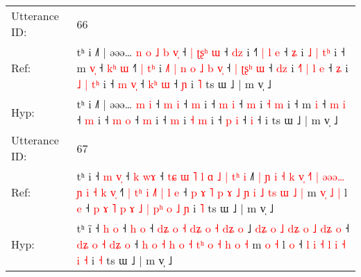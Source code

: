 \documentclass[10pt]{article}
\DeclareRobustCommand{\hl}[1]{{\textcolor{red}{#1}}}
\begin{document}
\begin{longtable}{ll}
 \\
\midrule
Utterance ID: & 66 \\
Ref: & tʰ i ˩˥ | əəə…\hl{ }\hl{n}\hl{ }\hl{o}\hl{ }\hl{˩} \hl{b} \hl{v}\hl{̩} ˧\hl{ }\hl{|} \hl{ʈ}\hl{ʂ}\hl{ʰ} \hl{ɯ} ˧ \hl{d}\hl{z} i ˧\hl{˥}\hl{ }\hl{|} \hl{l} \hl{e} ˧ \hl{ʑ} i\hl{ }\hl{˩} \hl{|} \hl{t}\hl{ʰ} i ˧ m \hl{v}\hl{̩} ˧ \hl{k}\hl{ʰ} \hl{ɯ} ˧\hl{˥}\hl{ }\hl{|} \hl{t}\hl{ʰ} i\hl{ }\hl{˩}\hl{˥}\hl{ }\hl{|}\hl{ }\hl{n}\hl{ }\hl{o}\hl{ }\hl{˩}\hl{ }\hl{b}\hl{ }\hl{v}\hl{̩} ˧\hl{ }\hl{|} \hl{ʈ}\hl{ʂ}\hl{ʰ} \hl{ɯ} ˧ \hl{d}\hl{z} i\hl{ }\hl{˧}\hl{˥}\hl{ }\hl{|}\hl{ }\hl{l}\hl{ }\hl{e} ˧ \hl{ʑ} i\hl{ }\hl{˩} \hl{|} \hl{t}\hl{ʰ} i ˧ \hl{m} \hl{v}\hl{̩} ˧\hl{ }\hl{k}\hl{ʰ} \hl{ɯ} ˧\hl{ }\hl{ɲ} i\hl{ }\hl{˥} ts ɯ ˩ | m v̩ ˩
 \\
Hyp: & tʰ i ˩˥ | əəə…\hl{}\hl{}\hl{}\hl{}\hl{}\hl{} \hl{m} \hl{}\hl{i} ˧\hl{}\hl{} \hl{}\hl{}\hl{m} \hl{i} ˧ \hl{}\hl{m} i ˧\hl{}\hl{}\hl{} \hl{m} \hl{i} ˧ \hl{m} i\hl{}\hl{} \hl{˧} \hl{}\hl{m} i ˧ m \hl{}\hl{i} ˧ \hl{}\hl{m} \hl{i} ˧\hl{}\hl{}\hl{} \hl{}\hl{m} i\hl{}\hl{}\hl{}\hl{}\hl{}\hl{}\hl{}\hl{}\hl{}\hl{}\hl{}\hl{}\hl{}\hl{}\hl{}\hl{} ˧\hl{}\hl{} \hl{}\hl{}\hl{m} \hl{o} ˧ \hl{}\hl{m} i\hl{}\hl{}\hl{}\hl{}\hl{}\hl{}\hl{}\hl{}\hl{} ˧ \hl{m} i\hl{}\hl{} \hl{˧} \hl{}\hl{m} i ˧ \hl{p} \hl{}\hl{i} ˧\hl{}\hl{}\hl{} \hl{i} ˧\hl{}\hl{} i\hl{}\hl{} ts ɯ ˩ | m v̩ ˩
 \\
\midrule
Utterance ID: & 67 \\
Ref: & tʰ i\hl{} ˧ \hl{m} \hl{v}\hl{̩} ˧ \hl{k} \hl{w}\hl{ɤ} ˧ \hl{t}\hl{ɕ} \hl{ɯ} \hl{˥} \hl{l}\hl{ }\hl{ɑ} \hl{˩} \hl{|} \hl{t}\hl{ʰ} \hl{i} ˩\hl{˥}\hl{ }\hl{|}\hl{ }\hl{ɲ}\hl{ }\hl{i}\hl{ }\hl{˧}\hl{ }\hl{k} \hl{v}\hl{̩} \hl{˧}\hl{˥} \hl{|} \hl{ə}\hl{ə}\hl{ə}\hl{…} \hl{ɲ} \hl{i} \hl{˧}\hl{ }\hl{k} \hl{v}\hl{̩} ˧\hl{˥}\hl{ }\hl{|} \hl{t}\hl{ʰ} \hl{i} \hl{˩}\hl{˥} \hl{|}\hl{ }\hl{l} \hl{e} ˧ \hl{p} \hl{ɤ} \hl{˥} \hl{p} \hl{ɤ} \hl{˩} \hl{ɲ}\hl{ }\hl{i} \hl{˩} \hl{t}\hl{s} \hl{ɯ} \hl{˩} \hl{|} m\hl{ }\hl{v}\hl{̩} \hl{˩} \hl{|} l \hl{e} ˧\hl{ }\hl{p}\hl{ }\hl{ɤ}\hl{ }\hl{˥} \hl{p} \hl{ɤ} \hl{˩} \hl{|} \hl{p}\hl{ʰ} \hl{o} \hl{˩} \hl{ɲ} i \hl{˥} ts ɯ ˩ | m v̩ ˩
 \\
Hyp: & tʰ i\hl{̃} ˧ \hl{h} \hl{}\hl{o} ˧ \hl{h} \hl{}\hl{o} ˧ \hl{d}\hl{ʑ} \hl{o} \hl{˧} \hl{}\hl{d}\hl{ʑ} \hl{o} \hl{˧} \hl{d}\hl{ʑ} \hl{o} ˩\hl{}\hl{}\hl{}\hl{}\hl{}\hl{}\hl{}\hl{}\hl{}\hl{}\hl{} \hl{d}\hl{ʑ} \hl{}\hl{o} \hl{˩} \hl{}\hl{}\hl{d}\hl{ʑ} \hl{o} \hl{˩} \hl{}\hl{d}\hl{ʑ} \hl{}\hl{o} ˧\hl{}\hl{}\hl{} \hl{d}\hl{ʑ} \hl{o} \hl{}\hl{˧} \hl{}\hl{d}\hl{ʑ} \hl{o} ˧ \hl{h} \hl{o} \hl{˧} \hl{h} \hl{o} \hl{˧} \hl{}\hl{t}\hl{ʰ} \hl{o} \hl{}\hl{˧} \hl{h} \hl{o} \hl{˧} m\hl{}\hl{}\hl{} \hl{o} \hl{˧} l \hl{o} ˧\hl{}\hl{}\hl{}\hl{}\hl{}\hl{} \hl{l} \hl{i} \hl{˧} \hl{l} \hl{}\hl{i} \hl{˧} \hl{i} \hl{˧} i \hl{˧} ts ɯ ˩ | m v̩ ˩

\end{longtable}
\end{document}
